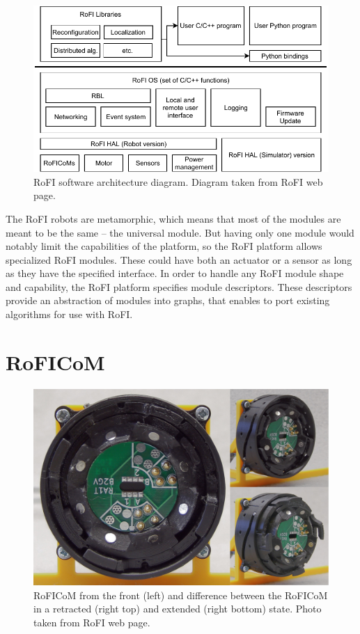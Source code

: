 \documentclass[
  digital, %
  table,   %
  oneside, %
  nolof,     %
  nolot,     %
]{fithesis3}
\begin{document}
\begin{figure}
    \centering
    \includegraphics[width=\linewidth]{data/rofi_architecture.pdf}
    \caption{RoFI software architecture diagram. Diagram taken from RoFI web page\cite{rofi-web}.}
    \label{fig:architecture}
\end{figure}

The RoFI robots are metamorphic, which means that most of the modules are meant to be the same -- the universal module.
But having only one module would notably limit the capabilities of the platform, so the RoFI platform allows specialized RoFI modules.
These could have both an actuator or a sensor as long as they have the specified interface.
In order to handle any RoFI module shape and capability, the RoFI platform specifies module descriptors\cite{rofi-thesis}.
These descriptors provide an abstraction of modules into graphs, that enables to port existing algorithms for use with RoFI.

\section{RoFICoM}
\label{roficom}

\begin{figure}
    \centering
    \includegraphics[width=\linewidth]{data/connector.jpg}
    \caption{RoFICoM from the front (left) and difference between the RoFICoM in a retracted (right top) and extended (right bottom) state. Photo taken from RoFI web page\cite{rofi-web}.}
    \label{fig:connector}
\end{figure}
\end{document}
